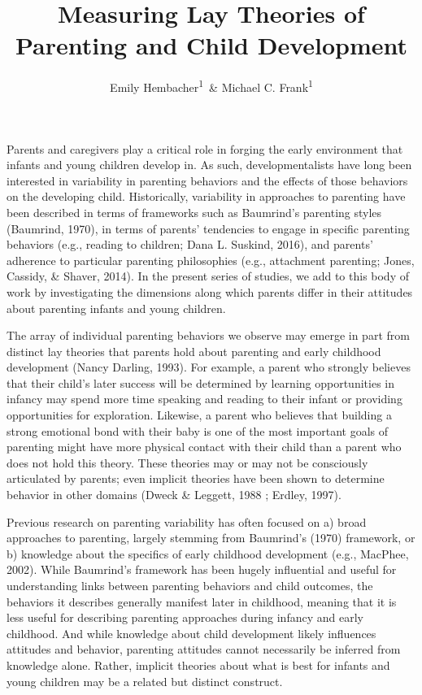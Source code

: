 \documentclass[floatsintext,man]{apa6}
\title{Measuring Lay Theories of Parenting and Child Development}
\author{Emily Hembacher\textsuperscript{1}~\& Michael C. Frank\textsuperscript{1}}
\affiliation{
    \vspace{0.5cm}
          \textsuperscript{1} Stanford University  }
\theoremstyle{definition}
\theoremstyle{definition}
\theoremstyle{definition}
\theoremstyle{remark}
\begin{document}
\maketitle

\setcounter{secnumdepth}{0}



Parents and caregivers play a critical role in forging the early
environment that infants and young children develop in. As such,
developmentalists have long been interested in variability in parenting
behaviors and the effects of those behaviors on the developing child.
Historically, variability in approaches to parenting have been described
in terms of frameworks such as Baumrind's parenting styles (Baumrind,
1970), in terms of parents' tendencies to engage in specific parenting
behaviors (e.g., reading to children; Dana L. Suskind, 2016), and
parents' adherence to particular parenting philosophies (e.g.,
attachment parenting; Jones, Cassidy, \& Shaver, 2014). In the present
series of studies, we add to this body of work by investigating the
dimensions along which parents differ in their attitudes about parenting
infants and young children.

The array of individual parenting behaviors we observe may emerge in
part from distinct lay theories that parents hold about parenting and
early childhood development (Nancy Darling, 1993). For example, a parent
who strongly believes that their child's later success will be
determined by learning opportunities in infancy may spend more time
speaking and reading to their infant or providing opportunities for
exploration. Likewise, a parent who believes that building a strong
emotional bond with their baby is one of the most important goals of
parenting might have more physical contact with their child than a
parent who does not hold this theory. These theories may or may not be
consciously articulated by parents; even implicit theories have been
shown to determine behavior in other domains (Dweck \& Leggett, 1988 ;
Erdley, 1997).

Previous research on parenting variability has often focused on a) broad
approaches to parenting, largely stemming from Baumrind's (1970)
framework, or b) knowledge about the specifics of early childhood
development (e.g., MacPhee, 2002). While Baumrind's framework has been
hugely influential and useful for understanding links between parenting
behaviors and child outcomes, the behaviors it describes generally
manifest later in childhood, meaning that it is less useful for
describing parenting approaches during infancy and early childhood. And
while knowledge about child development likely influences attitudes and
behavior, parenting attitudes cannot necessarily be inferred from
knowledge alone. Rather, implicit theories about what is best for
infants and young children may be a related but distinct construct.
\end{document}
